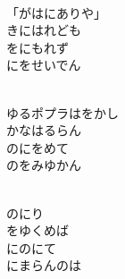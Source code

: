 \documentclass[10pt,b5j]{tarticle} %
\begin{document}
\vspace{1.5em} %
\newcommand{\linespace}{0.5em} %
\newcommand{\blocksize}{0.5\hsize} %
\newcommand{\itemmargin}{3em} %
\begin{enumerate} %
    \setlength{\itemindent}{\itemmargin} %
    \begin{minipage}[c]{\blocksize}
    
        \vspace{\linespace}
        \item~\\
        「がはにありや」\\
        きにはれども\\
        をにもれず\\
        にをせいでん
        
    \end{minipage}
    \begin{minipage}[c]{\blocksize}
        
        \vspace{\linespace}
        \item~\\
        ゆるポプラはをかし\\
        かなはるらん\\
        のにをめて\\
        のをみゆかん
        
    \end{minipage}
    \begin{minipage}[c]{\blocksize}
        
        \vspace{\linespace}
        \item~\\
        のにり\\
        をゆくめば\\
        にのにて\\
        にまらんのは
        

\end{minipage}
\end{enumerate}
\end{document}
